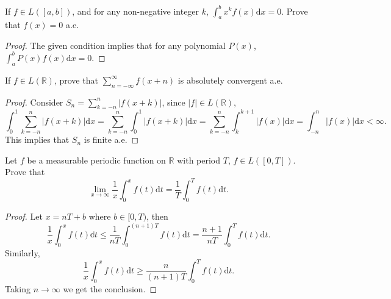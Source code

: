 \begin{exercise}{}{}
  If $f \in L([a,b])$, and for any non-negative integer $k$,
  $\int_a^b x^k f(x)\mathrm{d} x = 0$. Prove that $f(x) = 0$ a.e.
\end{exercise}

\begin{proof}
  The given condition implies that for any polynomial $P(x)$,
  $\int_a^b P(x)f(x)\mathrm{d} x = 0$.
\end{proof}

\begin{exercise}{}{}
  If $f \in L(\mathbb{R})$, prove that $\sum\limits_{n = -\infty}^{\infty}f(x+n)$ is absolutely convergent a.e.
\end{exercise}

\begin{proof}
  Consider $S_n = \sum_{k = -n}^n |f(x+k)|$,
  since $|f| \in L(\mathbb{R})$,
  \begin{equation}
    \int_0^1 \sum\limits_{k = -n}^n |f(x+k)|\mathrm{d}x
    = \sum\limits_{k = -n}^n \int_0^1 |f(x+k)|\mathrm{d}x
    = \sum\limits_{k = -n}^n \int_k^{k+1}|f(x)|\mathrm{d} x
    = \int_{-n}^n |f(x)|\mathrm{d} x < \infty.
  \end{equation}
  This implies that $S_n$ is finite a.e.
\end{proof}

\begin{exercise}{}{}
  Let $f$ be a measurable periodic function on $\mathbb{R}$ with period $T$,
  $f \in L([0, T])$. Prove that
  \begin{equation}
    \lim \limits _{x \rightarrow \infty} \frac{1}{x} \int_0^x f(t)\mathrm{d} t 
    = \frac{1}{T} \int_0^T f(t)\mathrm{d} t.
  \end{equation}
\end{exercise}

\begin{proof}
  Let $x = nT + b$ where $b \in [0, T)$, then
  \begin{equation}
    \frac{1}{x} \int_0^x f(t)\mathbb{d} t
    \leq \frac{1}{nT} \int_0^{(n+1)T} f(t)\mathrm{d} t
    = \frac{n+1}{nT} \int_0^T f(t)\mathrm{d} t.
  \end{equation}
  Similarly,
  \begin{equation}
    \frac{1}{x} \int_0^x f(t)\mathrm{d} t \geq \frac{n}{(n+1)T} \int_0^T f(t)\mathrm{d} t.
  \end{equation}
  Taking $n \rightarrow \infty$ we get the conclusion.
\end{proof}

